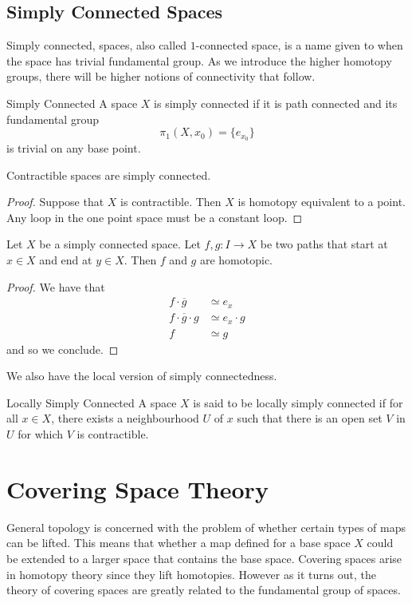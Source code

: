 \documentclass[a4paper]{article}
\begin{document}
\subsection{Simply Connected Spaces}
Simply connected, spaces, also called $1$-connected space, is a name given to when the space has trivial fundamental group. As we introduce the higher homotopy groups, there will be higher notions of connectivity that follow. 

\begin{defn}{Simply Connected}{} A space $X$ is simply connected if it is path connected and its fundamental group $$\pi_1(X,x_0)=\{e_{x_0}\}$$ is trivial on any base point. 
\end{defn}

\begin{prp}{}{} Contractible spaces are simply connected. \tcbline
\begin{proof}
Suppose that $X$ is contractible. Then $X$ is homotopy equivalent to a point. Any loop in the one point space must be a constant loop. 
\end{proof}
\end{prp}

\begin{lmm}{}{} Let $X$ be a simply connected space. Let $f,g:I\to X$ be two paths that start at $x\in X$ and end at $y\in X$. Then $f$ and $g$ are homotopic. \tcbline
\begin{proof}
We have that 
\begin{align*}
f\cdot\overline{g}&\simeq e_x\\
f\cdot\overline{g}\cdot g&\simeq e_x\cdot g\\
f&\simeq g
\end{align*}
and so we conclude. 
\end{proof}
\end{lmm}

We also have the local version of simply connectedness. 

\begin{defn}{Locally Simply Connected}{} A space $X$ is said to be locally simply connected if for all $x\in X$, there exists a neighbourhood $U$ of $x$ such that there is an open set $V$ in $U$ for which $V$ is contractible. 
\end{defn}

\pagebreak
\section{Covering Space Theory}
General topology is concerned with the problem of whether certain types of maps can be lifted. This means that whether a map defined for a base space $X$ could be extended to a larger space that contains the base space. Covering spaces arise in homotopy theory since they lift homotopies. However as it turns out, the theory of covering spaces are greatly related to the fundamental group of spaces. 
\end{document}
